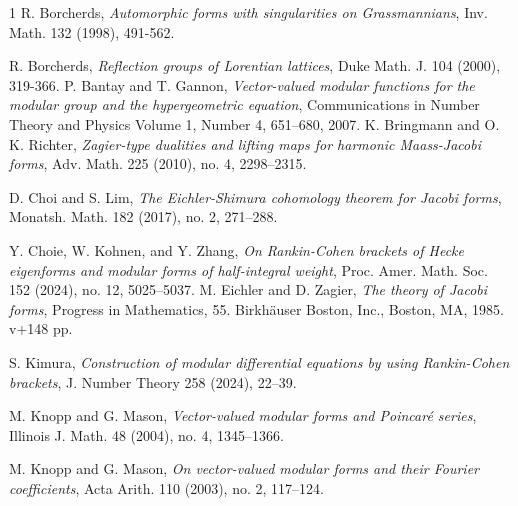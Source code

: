 \documentclass[11pt]{amsart}
\theoremstyle{definition}
\theoremstyle{remark}
\numberwithin{equation}{section}
\renewcommand{\(}{\left(}
\renewcommand{\)}{\right)}
\begin{document}


\begin{thebibliography}{1}
  R. Borcherds, {\it Automorphic forms with singularities on Grassmannians}, Inv. Math. 132 (1998), 491-562. 

         R. Borcherds, {\it Reflection groups of Lorentian lattices}, Duke Math. J. 104 (2000), 319-366.
 P. Bantay and T. Gannon, {\it Vector-valued modular functions for the modular group and the hypergeometric equation}, Communications in
    Number Theory and Physics Volume 1, Number 4, 651–680, 2007.   
 K. Bringmann and O. K. Richter, \textit{Zagier-type dualities and lifting maps for harmonic Maass-Jacobi forms}, Adv. Math. 225 (2010), no. 4, 2298–2315.

 D. Choi and S. Lim, \textit{The Eichler-Shimura cohomology theorem for Jacobi forms}, Monatsh. Math. 182 (2017), no. 2, 271–288.

 Y. Choie, W. Kohnen, and Y. Zhang, \textit{On Rankin-Cohen brackets of Hecke eigenforms and modular forms of half-integral weight}, Proc. Amer. Math. Soc. 152 (2024), no. 12, 5025–5037.
 M. Eichler and D. Zagier, \textit{The theory of Jacobi forms}, Progress in Mathematics, 55. Birkhäuser Boston, Inc., Boston, MA, 1985. v+148 pp.

 S. Kimura, \textit{Construction of modular differential equations by using Rankin-Cohen brackets}, J. Number Theory 258 (2024), 22–39.

 M. Knopp and G. Mason, \textit{Vector-valued modular forms and Poincar\'e series}, Illinois J. Math. 48 (2004), no. 4, 1345–1366.

 M. Knopp and G. Mason, \textit{On vector-valued modular forms and their Fourier coefficients}, Acta Arith. 110 (2003), no. 2, 117–124.


\end{thebibliography}
\end{document}
